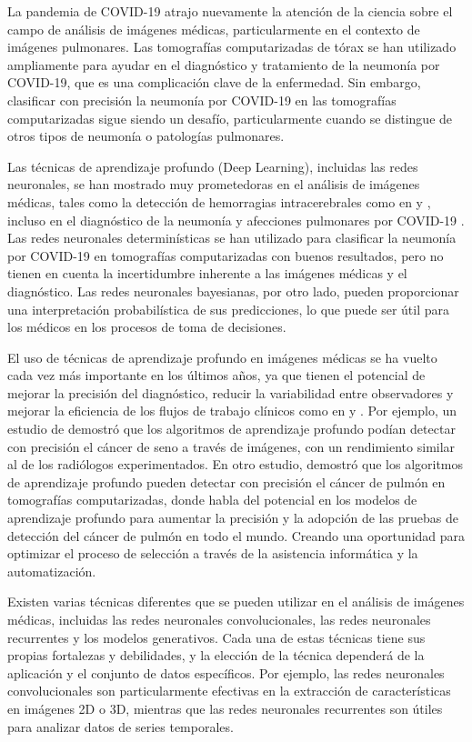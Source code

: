 \documentclass[10pt, oneside, a4paper]{article}
\begin{document}
	La pandemia de COVID-19 atrajo nuevamente la atención de la ciencia sobre el campo de análisis de imágenes médicas, particularmente en el contexto de imágenes pulmonares. Las tomografías computarizadas de tórax se han utilizado ampliamente para ayudar en el diagnóstico y tratamiento de la neumonía por COVID-19, que es una complicación clave de la enfermedad. Sin embargo, clasificar con precisión la neumonía por COVID-19 en las tomografías computarizadas sigue siendo un desafío, particularmente cuando se distingue de otros tipos de neumonía o patologías pulmonares.   
		
	Las técnicas de aprendizaje profundo (Deep Learning), incluidas las redes neuronales, se han mostrado muy prometedoras en el análisis de imágenes médicas, tales como la detección de hemorragias intracerebrales como en \cite{Sharrock2021} y \cite{Chang1609} , incluso en el diagnóstico de la neumonía y afecciones pulmonares por COVID-19 \cite{nn_lung_lesions}. Las redes neuronales determinísticas se han utilizado para clasificar la neumonía por COVID-19 en tomografías computarizadas con buenos resultados, pero no tienen en cuenta la incertidumbre inherente a las imágenes médicas y el diagnóstico. Las redes neuronales bayesianas, por otro lado, pueden proporcionar una interpretación probabilística de sus predicciones, lo que puede ser útil para los médicos en los procesos de toma de decisiones.
	
	El uso de técnicas de aprendizaje profundo en imágenes médicas se ha vuelto cada vez más importante en los últimos años, ya que tienen el potencial de mejorar la precisión del diagnóstico, reducir la variabilidad entre observadores y mejorar la eficiencia de los flujos de trabajo clínicos como en \cite{LUNDERVOLD2019102} y \cite{doi:10.1146/annurev-bioeng-071516-044442}. Por ejemplo, un estudio de \cite{McKinney2020} demostró que los algoritmos de aprendizaje profundo podían detectar con precisión el cáncer de seno a través de imágenes, con un rendimiento similar al de los radiólogos experimentados. En otro estudio, \cite{Ardila2019} demostró que los algoritmos de aprendizaje profundo pueden detectar con precisión el cáncer de pulmón en tomografías computarizadas, donde habla del potencial en los modelos de aprendizaje profundo para aumentar la precisión y la adopción de las pruebas de detección del cáncer de pulmón en todo el mundo. Creando una oportunidad para optimizar el proceso de selección a través de la asistencia informática y la automatización.
	
	Existen varias técnicas diferentes que se pueden utilizar en el análisis de imágenes médicas, incluidas las redes neuronales convolucionales, las redes neuronales recurrentes y los modelos generativos. Cada una de estas técnicas tiene sus propias fortalezas y debilidades, y la elección de la técnica dependerá de la aplicación y el conjunto de datos específicos. Por ejemplo, las redes neuronales convolucionales son particularmente efectivas en la extracción de características en imágenes 2D o 3D, mientras que las redes neuronales recurrentes son útiles para analizar datos de series temporales.
	
\end{document}
